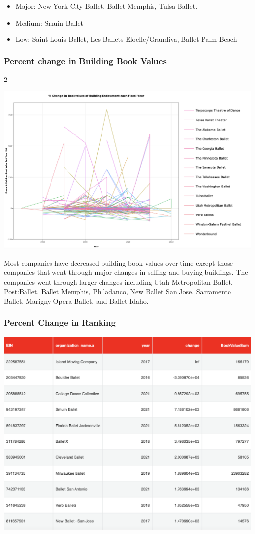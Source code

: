 \documentclass[Dance Data
Project,article,submit,moreauthors,pdftex]{mdpi}
\providecommand{\tightlist}{%
  \setlength{\itemsep}{0pt}\setlength{\parskip}{0pt}}
\begin{document}
\begin{itemize}
\tightlist
\item
  Major: New York City Ballet, Ballet Memphis, Tulsa Ballet.\\
\item
  Medium: Smuin Ballet\\
\item
  Low: Saint Louis Ballet, Les Ballets Eloelle/Grandiva, Ballet Palm
  Beach
\end{itemize}

\hypertarget{percent-change-in-building-book-values}{%
\subsubsection{Percent change in Building Book
Values}\label{percent-change-in-building-book-values}}

2

\includegraphics[width=0.9\linewidth,]{../images/percentage_building}

Most companies have decreased building book values over time except
those companies that went through major changes in selling and buying
buildings. The companies went through larger changes including Utah
Metropolitan Ballet, Post:Ballet, Ballet Memphis, Philadanco, New Ballet
San Jose, Sacramento Ballet, Marigny Opera Ballet, and Ballet Idaho.

\hypertarget{percent-change-in-ranking}{%
\subsubsection{Percent Change in
Ranking}\label{percent-change-in-ranking}}

\includegraphics[width=0.6\linewidth,]{../images/percent_change_ranking}
\end{document}

